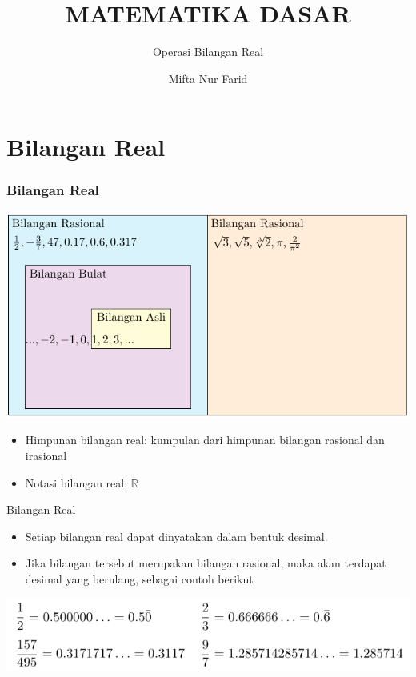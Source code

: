 \documentclass[pdflatex,compress,mathserif]{beamer}
\title{MATEMATIKA DASAR}
\subtitle{Operasi Bilangan Real}
\author{Mifta Nur Farid}
\begin{document}
\maketitle

\section{Bilangan Real}

\begin{frame}
\frametitle{Bilangan Real}
	\begin{center}
		\includegraphics[width=0.7\linewidth]{img/img01}
	\end{center}
	\begin{itemize}
		\item Himpunan bilangan real: kumpulan dari himpunan bilangan rasional dan irasional
		\item Notasi bilangan real: $\mathbb{R}$
	\end{itemize}
\end{frame}

\begin{frame}{Bilangan Real}
	\begin{itemize}
		\item Setiap bilangan real dapat dinyatakan dalam bentuk desimal.
		\item Jika bilangan tersebut merupakan bilangan rasional, maka akan terdapat desimal yang berulang, sebagai contoh berikut
	\end{itemize}
	\begin{center}
		\includegraphics[width=0.8\linewidth]{img/img02}
	\end{center}
\end{frame}
\end{document}
